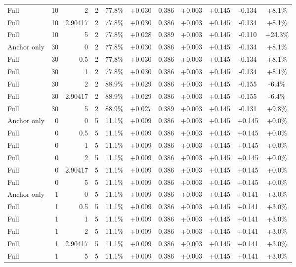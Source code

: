 \begin{table}[htbp]
\begin{tabular}{lrrrccccccc}
Full & 10 & 2 & 2 & 77.8\% & +0.030 & 0.386 & +0.003 & +0.145 & -0.134 & +8.1\% \\
Full & 10 & 2.90417 & 2 & 77.8\% & +0.030 & 0.386 & +0.003 & +0.145 & -0.134 & +8.1\% \\
Full & 10 & 5 & 2 & 77.8\% & +0.028 & 0.389 & +0.003 & +0.145 & -0.110 & +24.3\% \\
Anchor only & 30 & 0 & 2 & 77.8\% & +0.030 & 0.386 & +0.003 & +0.145 & -0.134 & +8.1\% \\
Full & 30 & 0.5 & 2 & 77.8\% & +0.030 & 0.386 & +0.003 & +0.145 & -0.134 & +8.1\% \\
Full & 30 & 1 & 2 & 77.8\% & +0.030 & 0.386 & +0.003 & +0.145 & -0.134 & +8.1\% \\
Full & 30 & 2 & 2 & 88.9\% & +0.029 & 0.386 & +0.003 & +0.145 & -0.155 & -6.4\% \\
Full & 30 & 2.90417 & 2 & 88.9\% & +0.029 & 0.386 & +0.003 & +0.145 & -0.155 & -6.4\% \\
Full & 30 & 5 & 2 & 88.9\% & +0.027 & 0.389 & +0.003 & +0.145 & -0.131 & +9.8\% \\
Anchor only & 0 & 0 & 5 & 11.1\% & +0.009 & 0.386 & +0.003 & +0.145 & +0.145 & +0.0\% \\
Full & 0 & 0.5 & 5 & 11.1\% & +0.009 & 0.386 & +0.003 & +0.145 & +0.145 & +0.0\% \\
Full & 0 & 1 & 5 & 11.1\% & +0.009 & 0.386 & +0.003 & +0.145 & +0.145 & +0.0\% \\
Full & 0 & 2 & 5 & 11.1\% & +0.009 & 0.386 & +0.003 & +0.145 & +0.145 & +0.0\% \\
Full & 0 & 2.90417 & 5 & 11.1\% & +0.009 & 0.386 & +0.003 & +0.145 & +0.145 & +0.0\% \\
Full & 0 & 5 & 5 & 11.1\% & +0.009 & 0.386 & +0.003 & +0.145 & +0.145 & +0.0\% \\
Anchor only & 1 & 0 & 5 & 11.1\% & +0.009 & 0.386 & +0.003 & +0.145 & +0.141 & +3.0\% \\
Full & 1 & 0.5 & 5 & 11.1\% & +0.009 & 0.386 & +0.003 & +0.145 & +0.141 & +3.0\% \\
Full & 1 & 1 & 5 & 11.1\% & +0.009 & 0.386 & +0.003 & +0.145 & +0.141 & +3.0\% \\
Full & 1 & 2 & 5 & 11.1\% & +0.009 & 0.386 & +0.003 & +0.145 & +0.141 & +3.0\% \\
Full & 1 & 2.90417 & 5 & 11.1\% & +0.009 & 0.386 & +0.003 & +0.145 & +0.141 & +3.0\% \\
Full & 1 & 5 & 5 & 11.1\% & +0.009 & 0.386 & +0.003 & +0.145 & +0.141 & +3.0\% \\

\end{tabular}
\end{table}
